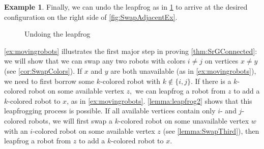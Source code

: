 \documentclass{amsart}
\newcommand{\quaad}{\quad\quad}
\newcommand{\vertex}[3][1]{
\node [circle,  fill, inner sep = 0pt,outer sep = 0pt, minimum size=#1mm] (#3) at #2 {};
}
\newcommand{\fg}[1]{
    \pgfdeclarelayer{foreground}
    \pgfsetlayers{main,foreground}
    \begin{pgfonlayer}{foreground}
    #1
    \end{pgfonlayer}
    }
\newcommand{\RedRobot}[2]{
\node [rectangle, cbred, fill, inner sep = 0pt,outer sep = 1pt, minimum size=2.3mm] (#2) at #1 {};
}
\newcommand{\GreenRobot}[2]{
\node [diamond, cbgreen, fill, inner sep = 0pt,outer sep = 1pt,minimum size=3mm] (#2) at #1 {};
}
\newcommand{\BlueRobot}[2]{
\node [isosceles triangle, shape border rotate=90,cbblue, fill, inner sep = 0pt,outer sep = 1pt,minimum size=2.5mm] (#2) at #1 {};
}
\theoremstyle{definition}
\newtheorem{ex}[thm]{Example}
\theoremstyle{remark}
\begin{document}
\begin{ex}
Finally, we can undo the leapfrog as in \cref{fig:ReverseLeapfrog} to arrive at the desired configuration on the right side of \cref{fig:SwapAdjacentEx}.

\begin{figure}[h!]
    \centering
    \quaad
\caption{Undoing the leapfrog}
\label{fig:ReverseLeapfrog}
\end{figure}
\end{ex}

\cref{ex:movingrobots} illustrates the first major step in proving \cref{thm:SrGConnected}: we will show that we can swap any two robots with colors $i\ne j$ on vertices $x\ne y$ (see \cref{cor:SwapColors}). If $x$ and $y$ are both unavailable (as in \cref{ex:movingrobots}), we need to first borrow some $k$-colored robot with $k\notin\{i,j\}$. If there is a $k$-colored robot on some available vertex $z,$ we can leapfrog a robot from $z$ to add a $k$-colored robot to $x$, as in \cref{ex:movingrobots}. \cref{lemma:leapfrog2} shows that this leapfrogging process is possible. If all available vertices contain only $i$- and $j$-colored robots, we will first swap a $k$-colored robot on some unavailable vertex $w$ with an $i$-colored robot on some available vertex $z$ (see \cref{lemma:SwapThird}), then leapfrog a robot from $z$ to add a $k$-colored robot to $x$. 
\end{document}
